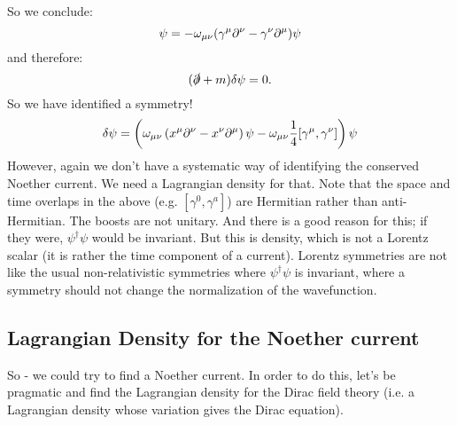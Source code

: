 So we conclude:
\begin{equation}
    [\gamma^\mu, \mathbb{S}]\psi = -\omega_{\mu\nu}(\gamma^\mu \p^\nu - \gamma^\nu \p^\mu)\psi
\end{equation}
and therefore:
\begin{equation}
    (\slashed{\partial} + m)\delta \psi = 0.
\end{equation}
So we have identified a symmetry!
\begin{equation}
    \delta \psi = \left(\omega_{\mu\nu}\left(x^\mu \partial^\nu - x^\nu \partial^\mu\right)\psi - \omega_{\mu\nu}\frac{1}{4}[\gamma^\mu, \gamma^\nu]\right)\psi
\end{equation}
However, again we don't have a systematic way of identifying the conserved Noether current. We need a Lagrangian density for that. Note that the space and time overlaps in the above (e.g. $[\gamma^0, \gamma^a]$) are Hermitian rather than anti-Hermitian. The boosts are not unitary. And there is a good reason for this; if they were, $\psi^\dag \psi$ would be invariant. But this is density, which is not a Lorentz scalar (it is rather the time component of a current). Lorentz symmetries are not like the usual non-relativistic symmetries where $\psi^\dag \psi$ is invariant, where a symmetry should not change the normalization of the wavefunction.

\subsection{Lagrangian Density for the Noether current}
So - we could try to find a Noether current. In order to do this, let's be pragmatic and find the Lagrangian density for the Dirac field theory (i.e. a Lagrangian density whose variation gives the Dirac equation).

